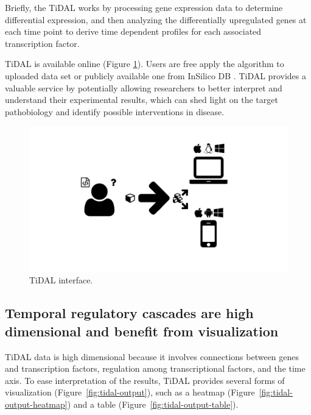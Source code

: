Briefly, the TiDAL works by processing gene expression data to determine differential expression, and then analyzing the differentially upregulated genes at each time point to derive time dependent profiles for each associated transcription factor.

TiDAL is available online (Figure \ref{fig:tidal-landing}). 
Users are free apply the algorithm to uploaded data set or publicly available one from InSilico DB \autocite{coletta2012insilico}.
TiDAL provides a valuable service by potentially allowing researchers to better interpret and understand their experimental results, which can shed light on the target pathobiology and identify possible interventions in disease.

\begin{figure}
  \centering
  \includegraphics[width=\textwidth, page=17, trim=0.37cm .65cm 0.37cm 0.3cm, clip=true]{images/Figures.pdf}
  \caption{TiDAL interface.}
  \label{fig:tidal-landing}
\end{figure}







\subsection{Temporal regulatory cascades are high dimensional and benefit from visualization}

TiDAL data is high dimensional because it involves connections between genes  and transcription factors, regulation among transcriptional factors, and the time axis.
To ease interpretation of the results, TiDAL provides several forms of visualization (Figure~\ref{fig:tidal-output}), such as a heatmap (Figure~\ref{fig:tidal-output-heatmap}) and a table (Figure~\ref{fig:tidal-output-table}).

